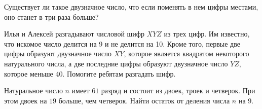 ﻿
\begin{itemize}

\itA Существует ли такое двузначное число, что если поменять в нем цифры местами, оно станет в три раза больше?

\itB Илья и Алексей разгадывают числовой шифр $XYZ$ из трех цифр. Им известно, что искомое число делится на 9 и не делится на 10. Кроме того, первые две цифры образуют двузначное число $XY$, которое является квадратом некоторого натурального числа, а две последние цифры образуют двузначное число $YZ$, которое меньше 40. Помогите ребятам разгадать шифр.

\itC Натуральное число $n$ имеет $61$ разряд и состоит из двоек, троек и четверок. При этом двоек на $19$ больше, чем четверок. Найти остаток от деления числа $n$ на 9.
\end{itemize}